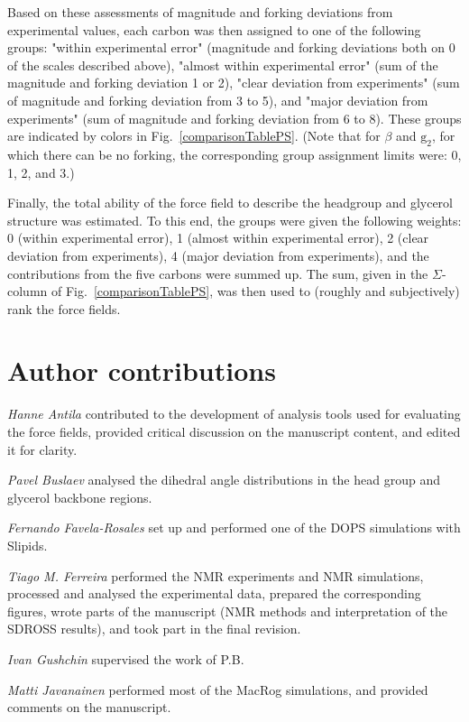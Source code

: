 \documentclass[journal=jpcbfk,manuscript=article]{achemso}
\begin{document}
\noindent Based on these assessments of magnitude and forking deviations from experimental values,
each carbon was then assigned to one of the following groups: "within experimental error"
(magnitude and forking deviations both on 0 of the scales described above),
"almost within experimental error"
(sum of the magnitude and forking deviation 1 or 2),
"clear deviation from experiments"
(sum of magnitude and forking deviation from 3 to 5), and
"major deviation from experiments"
(sum of magnitude and forking deviation from 6 to 8).
These groups are indicated by colors in Fig.~\ref{comparisonTablePS}.
(Note that for $\beta$ and $\mathrm{g_2}$, for which there can be no forking,
the corresponding group assignment limits were: 0, 1, 2, and 3.)

Finally, the total ability of the force field to describe the headgroup and
glycerol structure was estimated.
To this end, the groups were given the following weights:
0 (within experimental error),
1 (almost within experimental error),
2 (clear deviation from experiments),
4 (major deviation from experiments),
and the contributions from the five carbons were summed up.
The sum, given in the $\Sigma$-column of Fig.~\ref{comparisonTablePS},
was then used to (roughly and subjectively) rank the force fields.

\section{Author contributions}
\noindent
{\it Hanne Antila}
contributed to the development of analysis tools used for evaluating the force fields,  provided critical discussion on the manuscript content, and edited it for clarity.

\noindent
{\it Pavel Buslaev}
analysed the dihedral angle distributions in the head group and glycerol backbone regions.

\noindent
{\it Fernando Favela-Rosales}
set up and performed one of the DOPS simulations with Slipids.

\noindent
{\it Tiago M. Ferreira}
performed the NMR experiments and NMR simulations, processed and analysed the experimental data, prepared the corresponding figures, wrote parts of the manuscript (NMR methods and interpretation of the SDROSS results), and took part in the final revision.

\noindent
{\it Ivan Gushchin}
supervised the work of P.B.

\noindent
{\it Matti Javanainen}
performed most of the MacRog simulations, and provided comments on the manuscript.
\end{document}
